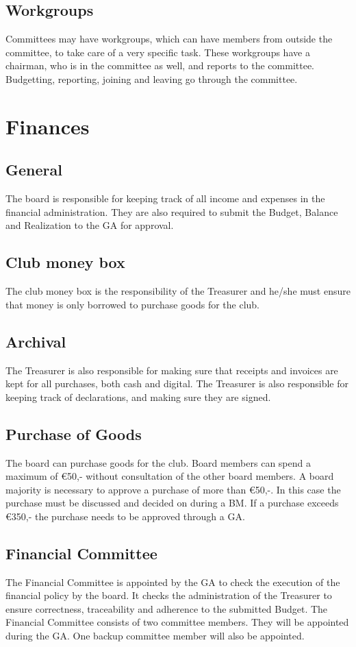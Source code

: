 \documentclass[a4paper]{article}
\begin{document}
\subsection{Workgroups}
Committees may have workgroups, which can have members from outside the committee, to take care of a very specific task. These workgroups have a chairman, who is in the committee as well, and reports to the committee. Budgetting, reporting, joining and leaving go through the committee.


\section{Finances}
\subsection{General}
The board is responsible for keeping track of all income and expenses in the financial administration. They are also required to submit the Budget, Balance and Realization to the GA for approval.

\subsection{Club money box}
The club money box is the responsibility of the Treasurer and he/she must ensure that money is only borrowed to purchase goods for the club.

\subsection{Archival}
The Treasurer is also responsible for making sure that receipts and invoices are kept for all purchases, both cash and digital. The Treasurer is also responsible for keeping track of declarations, and making sure they are signed.

\subsection{Purchase of Goods}
The board can purchase goods for the club. Board members can spend a maximum of €50,- without consultation of the other board members. A board majority is necessary to approve a purchase of more than €50,-. In this case the purchase must be discussed and decided on during a BM. If a purchase exceeds €350,- the purchase needs to be approved through a GA.

\subsection{Financial Committee}
The Financial Committee is appointed by the GA to check the execution of the financial policy by the board. It checks the administration of the Treasurer to ensure correctness, traceability and adherence to the submitted Budget. The Financial Committee consists of two committee members. They will be appointed during the GA. One backup committee member will also be appointed.
\end{document}
